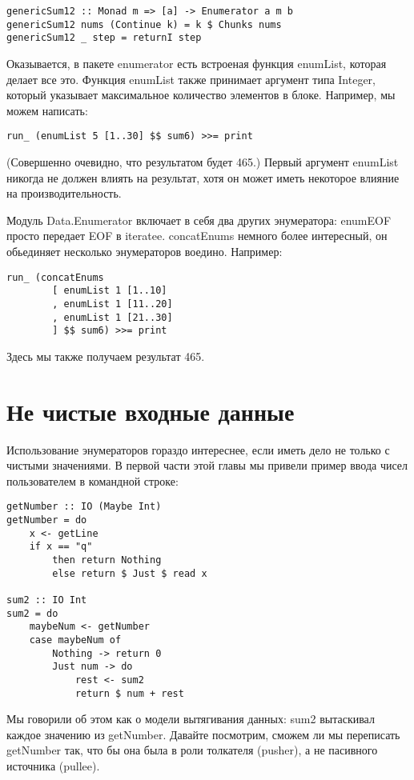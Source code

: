\begin{lstlisting}
genericSum12 :: Monad m => [a] -> Enumerator a m b
genericSum12 nums (Continue k) = k $ Chunks nums
genericSum12 _ step = returnI step
\end{lstlisting}%

Оказывается, в пакете enumerator есть встроеная функция enumList, которая делает все это. Функция enumList также принимает аргумент типа Integer, который указывает максимальное количество элементов в блоке. Например, мы можем написать:

\begin{lstlisting}
run_ (enumList 5 [1..30] $$ sum6) >>= print
\end{lstlisting}%

(Совершенно очевидно, что результатом будет 465.) Первый аргумент enumList никогда не должен влиять на результат, хотя он может иметь некоторое влияние на производительность.

Модуль Data.Enumerator включает в себя два других энумератора: enumEOF просто передает EOF в iteratee. concatEnums немного более интересный, он обьединяет несколько энумераторов воедино. Например:

\begin{lstlisting}
run_ (concatEnums
        [ enumList 1 [1..10]
        , enumList 1 [11..20]
        , enumList 1 [21..30]
        ] $$ sum6) >>= print
\end{lstlisting}%

Здесь мы также получаем результат 465.

\section{Не чистые входные данные}

Использование энумераторов гораздо интереснее, если иметь дело не только с чистыми значениями. В первой части этой главы мы привели пример ввода чисел пользователем в командной строке:

\begin{lstlisting}
getNumber :: IO (Maybe Int)
getNumber = do
    x <- getLine
    if x == "q"
        then return Nothing
        else return $ Just $ read x

sum2 :: IO Int
sum2 = do
    maybeNum <- getNumber
    case maybeNum of
        Nothing -> return 0
        Just num -> do
            rest <- sum2
            return $ num + rest
\end{lstlisting}%

Мы говорили об этом как о модели вытягивания данных: sum2 вытаскивал каждое значению из getNumber. Давайте посмотрим, сможем ли мы переписать getNumber так, что бы она была в роли толкателя (pusher), а не пасивного источника (pullee).

